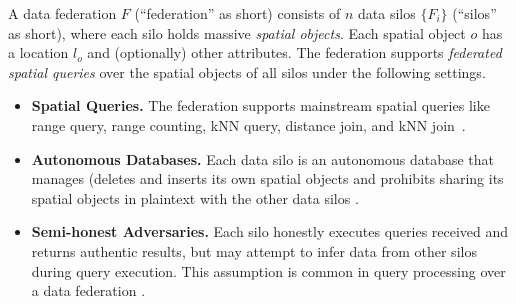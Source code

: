 A data federation $F$ (``federation'' as short) consists of $n$ data silos $\{F_i\}$ (``silos'' as short), where each silo holds massive \textit{spatial objects}.
Each spatial object $o$ has a location $l_o$ and (optionally) other attributes.
The federation supports \textit{federated spatial queries} over the spatial objects of all silos under the following settings.
\begin{itemize}
    \item \textbf{Spatial Queries.}
    The federation supports mainstream spatial queries like range query, range counting, kNN query, distance join, and kNN join~\cite{DBLP:series/synthesis/2011Mamoulis,sigmod16simba}.
    
    \item \textbf{Autonomous Databases.} 
    Each data silo is an autonomous database that manages (\eg deletes and inserts its own spatial objects and prohibits sharing its spatial objects in plaintext with the other data silos \cite{vldb17smcql, eurosys19conclave, DBLP:journals/pvldb/BaterHEMR18, DBLP:journals/pvldb/BaterP0WR20}.
    
    \item \textbf{Semi-honest Adversaries.} 
    Each silo honestly executes queries received and returns authentic results, but may attempt to infer data from other silos during query execution.
	This assumption is common in query processing over a data federation \cite{vldb17smcql, eurosys19conclave, DBLP:journals/pvldb/BaterHEMR18, DBLP:journals/pvldb/BaterP0WR20}.
\end{itemize}

